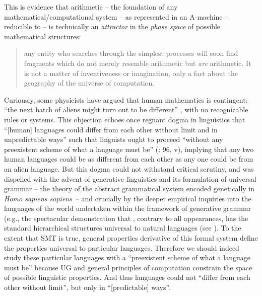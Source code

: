 \documentclass[output=paper]{langsci/langscibook}
\begin{document}
This is evidence that arithmetic – the foundation of any
mathematical/com\-pu\-tational system – as represented in an A-machine – reducible
to  – is technically an \emph{attractor} in the \emph{phase space}
of possible mathematical structures: \blockquote{any entity who searches through the
simplest processes will soon find fragments which do not merely resemble
arithmetic but \emph{are} arithmetic. It is not a matter of inventiveness or
imagination, only a fact about the geography of the universe of computation.
\hfill\citep[122]{Minsky1985}} Curiously, some physicists have argued that human
mathematics is contingent: “the next batch of aliens might turn out to be
different” \citep[774]{HutAlfordTegmark2006}, with no recognizable rules or
systems. This objection echoes once regnant dogma in linguistics that “[human]
languages could differ from each other without limit and in unpredictable ways”
such that linguists ought to proceed “without any preexistent scheme of what a
language must be” (\citealt{Joos1957}: 96, v), implying that any two human
languages could be as different from each other as any one could be from an
alien language. But this dogma could not withstand critical scrutiny, and was
dispelled with the advent of generative linguistics and its formulation of
universal grammar – the theory of the abstract grammatical system encoded
genetically in \emph{Homo sapiens sapiens}~– and crucially by the deeper
empirical inquiries into the languages of the world undertaken within the
framework of generative grammar (e.g., the spectacular demonstration that
, contrary to all appearances, has the standard hierarchical
structures universal to natural languages (see \citealt{Hale1976,Legate2001}).
To the extent that \gls{SMT} is true, general
properties derivative of this formal system define the properties universal to
particular languages.  Therefore we should indeed study these particular
languages with a “preexistent scheme of what a language must be” because
\gls{UG} and general principles of computation constrain
the space of possible linguistic properties. And thus languages could not
“differ from each other without limit”, but only in “[predictable] ways”.
\end{document}
